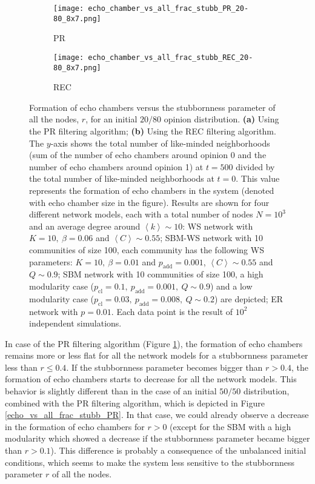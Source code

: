 \documentclass[11 pt , letterpaper , twoside , openright]{book}
\begin{document}
\begin{figure}[H]
  \begin{subfigure}[b]{0.49\textwidth}
  	\texttt{[image: echo\_chamber\_vs\_all\_frac\_stubb\_PR\_20-80\_8x7.png]}
    \caption{PR}
    \label{PR_all_frac_stubb_20-80}
  \end{subfigure}
  \begin{subfigure}[b]{0.49\textwidth}
  	\texttt{[image: echo\_chamber\_vs\_all\_frac\_stubb\_REC\_20-80\_8x7.png]}
    \caption{REC}
    \label{REC_all_frac_stubb_20-80}
  \end{subfigure}
  \captionsetup{format=plain}
  \caption[Formation of echo chambers versus the stubbornness parameter of all the nodes, $r$, for the PR and REC filtering algorithms and an initial $20/80$ opinion distribution.]{Formation of echo chambers versus the stubbornness parameter of all the nodes, $r$, for an initial $20/80$ opinion distribution. \textbf{(a)} Using the PR filtering algorithm; \textbf{(b)} Using the REC filtering algorithm. The $y$-axis shows the total number of like-minded neighborhoods (sum of the number of echo chambers around opinion 0 and the number of echo chambers around opinion 1) at $t=500$ divided by the total number of like-minded neighborhoods at $t=0$. This value represents the formation of echo chambers in the system (denoted with echo chamber size in the figure). Results are shown for four different network models, each with a total number of nodes $N=10^3$ and an average degree around $\left<k\right> \sim 10$: WS network with $K =10,\ \beta = 0.06$ and $\left<C\right> \sim 0.55$; SBM-WS network with 10 communities of size 100, each community has the following WS parameters: $K = 10,\ \beta = 0.01$ and $p_{\text{add}} = 0.001$, $\left<C\right> \sim 0.55$ and $Q \sim 0.9$; SBM network with 10 communities of size 100, a high modularity case ($p_{\text{cl}} = 0.1,\ p_{\text{add}} = 0.001,\ Q \sim 0.9$) and a low modularity case ($p_{\text{cl}} = 0.03,\ p_{\text{add}} = 0.008,\ Q \sim 0.2$) are depicted; ER network with $p= 0.01$. Each data point is the result of $10^2$ independent simulations.}
\label{echo_vs_all_frac_stubb_PR-REC_20-80}
\end{figure}
\noindent
In case of the PR filtering algorithm (Figure \ref{PR_all_frac_stubb_20-80}), the formation of echo chambers remains more or less flat for all the network models for a stubbornness parameter less than $r \leqslant 0.4$. If the stubbornness parameter becomes bigger than $r > 0.4$, the formation of echo chambers starts to decrease for all the network models. This behavior is slightly different than in the case of an initial $50/50$ distribution, combined with the PR filtering algorithm, which is depicted in Figure \ref{echo_vs_all_frac_stubb_PR}. In that case, we could already observe a decrease in the formation of echo chambers for $r > 0$ (except for the SBM with a high modularity which showed a decrease if the stubbornness parameter became bigger than $r>0.1$). This difference is probably a consequence of the unbalanced initial conditions, which seems to make the system less sensitive to the stubbornness parameter $r$ of all the nodes.\\
\end{document}
